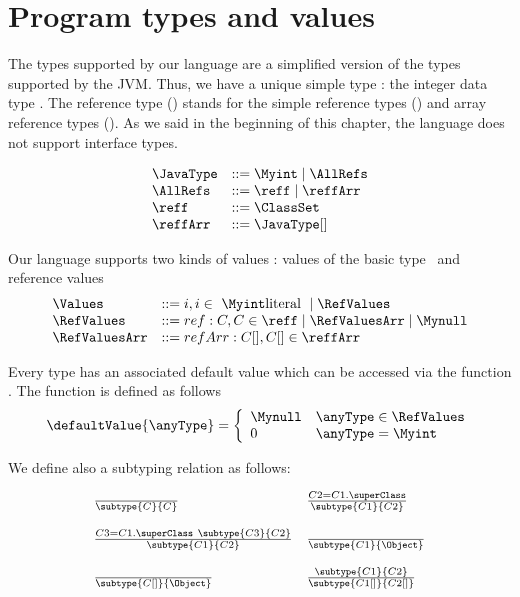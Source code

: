 
\section{Program types and values}\label{types}
 The types supported by our language are a simplified version
 of the types supported by the JVM.
 Thus, we have a unique simple type : the integer data type \Myint.
 The reference type (\AllRefs) stands for the simple reference types ()
 and array reference types ().
 As we said in the beginning of this chapter, the language does not support interface types.

 
$$ \begin{array}{ll}
          \JavaType & ::= \Myint \mid \AllRefs\\
          \AllRefs  & ::= \reff \mid \reffArr \\
	  \reff     & ::= \ClassSet \\
	  \reffArr  & ::= \JavaType[]	  
   \end{array}  $$


Our language supports two kinds of values : values of the basic type \Myint  \ and reference values
$$ \begin{array}{ll}
             \Values &       ::= i, i \in \  \Myint \mbox{\rm literal } \mid \RefValues \\
	     \RefValues &    ::= ref: C , C \in \reff \mid \RefValuesArr  \mid   \Mynull \\
	     \RefValuesArr & ::= refArr   : C\lbrack \rbrack,  C\lbrack \rbrack \in \reffArr
  \end{array} $$


Every type has an associated default value which can be accessed via
the function . The function is defined as follows
$$ \defaultValue{\anyType} = 
           \left\{\begin{array}{ll}
	      \Mynull & \anyType \in \RefValues \\
	       0 &  \anyType = \Myint
	    \end{array}\right. $$

We define also a subtyping relation as follows:

$$\begin{array}{ll}
  \frac{}{ \subtype{C}{C}} &  
  \frac{   C2 = C1.\superClass  }{\subtype{C1}{C2}} \\  
  & \\
  \frac{ C3 = C1.\superClass \   \subtype{C3}{C2} }{ \subtype{C1}{C2} } &
  \frac{}{  \subtype{C1}{\Object}} \\
  & \\
  \frac{   }{\subtype{C[]}{\Object}} &  
  \frac{ \subtype{C1}{C2}}{\subtype{C1[]}{C2[]}} \\
  \end{array}$$
